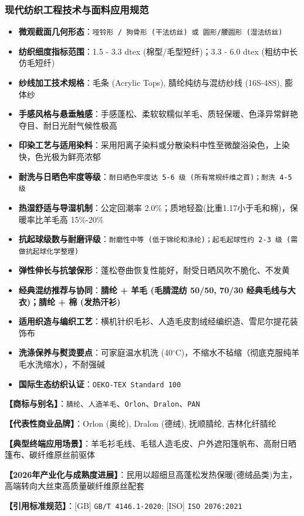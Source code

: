 \documentclass[11pt,openright,twoside,UTF8]{ctexbook}
\begin{document}
\subsubsection*{现代纺织工程技术与面料应用规范}
\begin{itemize} \setlength{\itemsep}{2pt}
    \item \textbf{微观截面几何形态}：\texttt{哑铃形 / 狗骨形 (干法纺丝) 或 圆形/腰圆形 (湿法纺丝)}
    \item \textbf{纺织细度指标范围}：1.5 - 3.3 dtex (棉型/毛型短纤)；3.3 - 6.0 dtex (粗纺中长仿毛短纤)
    \item \textbf{纱线加工技术规格}：毛条 (Acrylic Tops), 腈纶纯纺与混纺纱线 (16S-48S), 膨体纱
    \item \textbf{手感风格与悬垂触感}：手感蓬松、柔软软糯似羊毛、质轻保暖、色泽异常鲜艳夺目、耐日光耐气候性极高
    \item \textbf{印染工艺与适用染料}：采用阳离子染料或分散染料中性至微酸浴染色，上染快，色光极为鲜亮浓郁
    \item \textbf{耐洗与日晒色牢度等级}：\texttt{耐日晒色牢度达 5-6 级 (所有常规纤维之首)；耐洗 4-5 级}
    \item \textbf{热湿舒适与导湿机制}：公定回潮率 2.0\%；质地轻盈(比重1.17小于毛和棉)，保暖率比羊毛高 15\%-20\%
    \item \textbf{抗起球级数与耐磨评级}：\texttt{耐磨性中等 (低于锦纶和涤纶)；起毛起球性约 2-3 级 (需做抗起球化学整理)}
    \item \textbf{弹性伸长与抗皱保形}：蓬松卷曲恢复性能好，耐受日晒风吹不脆化、不发黄
    \item \textbf{经典混纺推荐与协同}：\textbf{腈纶 + 羊毛 (毛腈混纺 50/50, 70/30 经典毛线与大衣)；腈纶 + 棉 (发热汗衫)}
    \item \textbf{适用织造与编织工艺}：横机针织毛衫、人造毛皮割绒经编织造、雪尼尔提花装饰布
    \item \textbf{洗涤保养与熨烫要点}：可家庭温水机洗 (40$^\circ\mathrm{C}$)，不缩水不毡缩（彻底克服纯羊毛水洗缩水），不耐强碱
    \item \textbf{国际生态纺织认证}：\texttt{OEKO-TEX Standard 100}
\end{itemize}
\vspace{0.2cm}

\noindent\textbf{【商标与别名】}：\texttt{腈纶}、\texttt{人造羊毛}、\texttt{Orlon}、\texttt{Dralon}、\texttt{PAN}\par
\noindent\textbf{【代表性商业品牌】}：Orlon (奥纶), Dralon (德绒), 抚顺腈纶, 吉林化纤腈纶\par
\noindent\textbf{【典型终端应用场景】}：羊毛衫毛线、毛毯人造毛皮、户外遮阳篷帆布、高耐日晒篷布、碳纤维原丝前驱体\par
\noindent\textbf{【2026年产业化与成熟度进展】}：民用以超细旦高蓬松发热保暖(德绒品类)为主，高端转向大丝束高质量碳纤维原丝配套\par
\noindent\textbf{【引用标准规范】}：[GB] \texttt{GB/T 4146.1-2020}; [ISO] \texttt{ISO 2076:2021}\par
\vspace{0.5cm}
\end{document}
